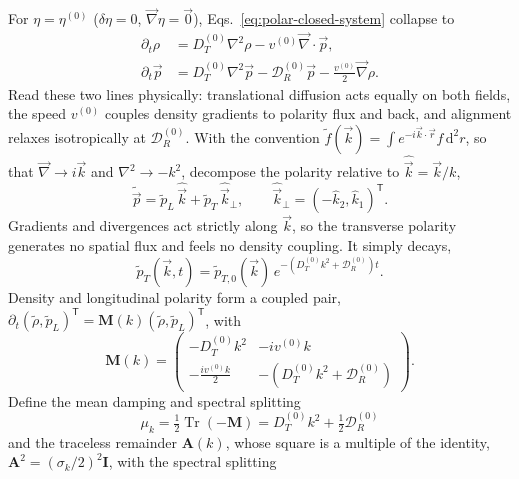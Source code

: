 \documentclass[
  reprint,
  superscriptaddress,
  amsmath,
  amssymb,
  aps,
  pre,
  nofootinbib,
  floatfix
]{revtex4-2}
\newcommand{\rv}{\vec r}
\newcommand{\pv}{\vec p}
\newcommand{\Id}{\mathbf I}
\newcommand{\grad}{\vec{\nabla}}
\newcommand{\lap}{\nabla^2}
\newcommand{\dd}{\mathrm d}
\newcommand{\DR}{\mathcal D_R^{(0)}}
\begin{document}
For $\eta=\eta^{(0)}$ ($\delta\eta=0$, $\grad\eta=\vec0$),
Eqs.~\eqref{eq:polar-closed-system} collapse to
\begin{subequations}
\label{eq:uniform-density-polarity}
\begin{align}
 \partial_t\rho&=D_T^{(0)}\lap\rho-v^{(0)}\grad\cdot\pv,
 \label{eq:uniform-density}\\
 \partial_t\pv&=D_T^{(0)}\lap\pv-\DR\pv
 -\frac{v^{(0)}}{2}\grad\rho.
 \label{eq:uniform-polarity}
\end{align}
\end{subequations}
Read these two lines physically: translational diffusion acts equally on both
fields, the speed $v^{(0)}$ couples density gradients to polarity flux and
back, and alignment relaxes isotropically at $\DR$.  With the convention
$\tilde f(\vec k)=\int e^{-i\vec k\cdot\rv}f\,\dd^2r$, so that
$\grad\to i\vec k$ and $\lap\to-k^2$, decompose the polarity relative to
$\hat{\vec k}=\vec k/k$,
\begin{equation}
 \tilde\pv = \tilde p_L\,\hat{\vec k} + \tilde p_T\,\hat{\vec k}_{\perp},
 \qquad \hat{\vec k}_{\perp}=(-\hat k_2,\hat k_1)^{\mathsf T}.
 \label{eq:polarity-fourier-decomposition}
\end{equation}
Gradients and divergences act strictly along $\vec k$, so the transverse
polarity generates no spatial flux and feels no density coupling.  It simply
decays,
\begin{equation}
 \tilde p_T(\vec k,t) = \tilde p_{T,0}(\vec k)\,e^{-\left(D_T^{(0)}k^2+\DR\right)t}.
 \label{eq:arbitrary-transverse-solution}
\end{equation}
Density and longitudinal polarity form a coupled pair,
$\partial_t(\tilde\rho,\tilde p_L)^{\mathsf T}
=\mathbf M(k)(\tilde\rho,\tilde p_L)^{\mathsf T}$, with
\begin{equation}
 \mathbf M(k) = \begin{pmatrix}
   -D_T^{(0)}k^2 & -i v^{(0)}k \\
   -\frac{i v^{(0)}k}{2} & -\left(D_T^{(0)}k^2 + \DR\right)
 \end{pmatrix}.
 \label{eq:longitudinal-system-matrix}
\end{equation}
Define the mean damping and spectral splitting
\begin{equation}
 \mu_k = \tfrac12\operatorname{Tr}(-\mathbf M) = D_T^{(0)}k^2 + \tfrac12\DR
 \label{eq:mean-damping-rate}
\end{equation}
and the traceless remainder $\mathbf A(k)$, whose square is a multiple of the
identity, $\mathbf A^2=(\sigma_k/2)^2\Id$, with the spectral splitting
\end{document}
